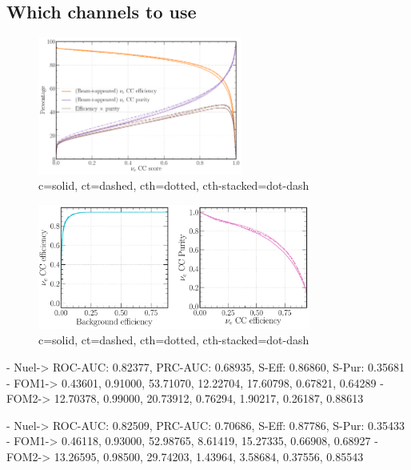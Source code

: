 \subsection{Which channels to use} %
\label{sec:cvn_baseline_channel} %

\begin{figure} %
    \includegraphics[width=0.6\textwidth]{diagrams/7-cvn/chipsnet/channel_nuel_eff_curves.pdf}
    \caption[channel nuel eff curves short]
    {c=solid, ct=dashed, cth=dotted, cth-stacked=dot-dash}
    \label{fig:channel_nuel_eff_curves}
\end{figure}

\begin{figure} %
    \includegraphics[width=0.8\textwidth]{diagrams/7-cvn/chipsnet/channel_nuel_comp_curves.pdf}
    \caption[channel nuel comp curves short]
    {c=solid, ct=dashed, cth=dotted, cth-stacked=dot-dash}
    \label{fig:channel_nuel_comp_curves}
\end{figure}

- Nuel-> ROC-AUC: 0.82377, PRC-AUC: 0.68935, S-Eff: 0.86860, S-Pur: 0.35681
- FOM1-> 0.43601, 0.91000, 53.71070, 12.22704, 17.60798, 0.67821, 0.64289
- FOM2-> 12.70378, 0.99000, 20.73912, 0.76294, 1.90217, 0.26187, 0.88613

- Nuel-> ROC-AUC: 0.82509, PRC-AUC: 0.70686, S-Eff: 0.87786, S-Pur: 0.35433
- FOM1-> 0.46118, 0.93000, 52.98765, 8.61419, 15.27335, 0.66908, 0.68927
- FOM2-> 13.26595, 0.98500, 29.74203, 1.43964, 3.58684, 0.37556, 0.85543


